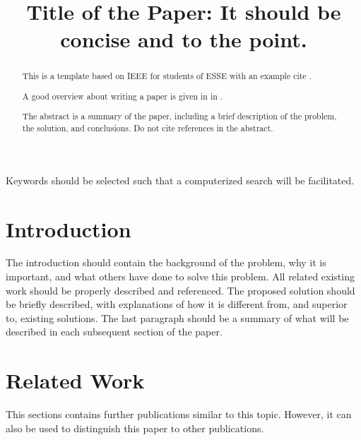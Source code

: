 \documentclass[conference]{IEEEtran}
\title{Title of the Paper: It should be concise and to the point.}
\author{%
	\IEEEauthorblockN{%
		<Firstname> <Lastname>
	}
	\IEEEauthorblockA{\itshape%
		Vienna University of Technology\\
		Industrial Software (INSO)\\
		1040 Vienna, Austria\\
		E-mail: \email{<email>}
	}
}
\begin{document}

\maketitle

\begin{abstract}
	This is a template based on IEEE for students of \ac{ESSE} with an example cite \cite{grechenig:2009:softwaretechnik}.

	A good overview about writing a paper is given in \citeauthor{li:1999:hints-on-writing-technical-papers-and-making-presentations} in \cite{li:1999:hints-on-writing-technical-papers-and-making-presentations}.

	The abstract is a summary of the paper, including a brief description of the problem, the solution, and conclusions. Do not cite references in the abstract.
\end{abstract}

\begin{IEEEkeywords}
	Keywords should be selected such that a computerized search will be facilitated.
\end{IEEEkeywords}

\IEEEpeerreviewmaketitle


\section{Introduction}

The introduction should contain the background of the problem, why it is important, and what others have done to solve this problem. All related existing work should be properly described and referenced. The proposed solution should be briefly described, with explanations of how it is different from, and superior to, existing solutions. The last paragraph should be a summary of what will be described in each subsequent section of the paper.

\section{Related Work}

This sections contains further publications similar to this topic. However, it can also be used to distinguish this paper to other publications.
\end{document}
